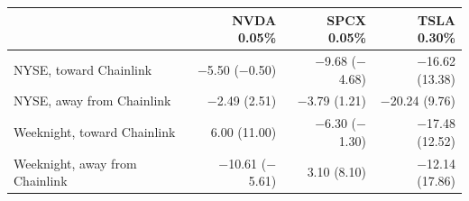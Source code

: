 \begin{tabular}{lrrr}
\toprule
 & NVDA 0.05\% & SPCX 0.05\% & TSLA 0.30\% \\
\midrule
NYSE, toward Chainlink & $-$5.50 ($-$0.50) & $-$9.68 ($-$4.68) & $-$16.62 (13.38) \\
NYSE, away from Chainlink & $-$2.49 (2.51) & $-$3.79 (1.21) & $-$20.24 (9.76) \\
Weeknight, toward Chainlink & 6.00 (11.00) & $-$6.30 ($-$1.30) & $-$17.48 (12.52) \\
Weeknight, away from Chainlink & $-$10.61 ($-$5.61) & 3.10 (8.10) & $-$12.14 (17.86) \\
\bottomrule
\end{tabular}
